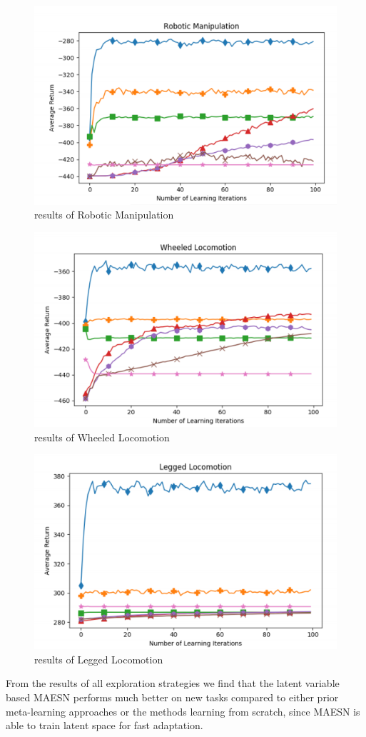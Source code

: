 \begin{figure}[H]
	\includegraphics[scale=0.6]{MAESN_09.PNG}
	\centering
	\caption{results of Robotic Manipulation}
	\label{MAESN}
\end{figure}
\begin{figure}[H]
	\includegraphics[scale=0.6]{MAESN_10.PNG}
	\centering
	\caption{results of Wheeled Locomotion}
	\label{MAESN}
\end{figure}
\begin{figure}[H]
	\includegraphics[scale=0.6]{MAESN_11.PNG}
	\centering
	\caption{results of Legged Locomotion}
	\label{MAESN}
\end{figure}
From the results of all exploration strategies we find that the latent variable based MAESN performs much better on new tasks compared to either prior meta-learning approaches or the methods learning from scratch, since MAESN is able to train latent space for fast adaptation.









